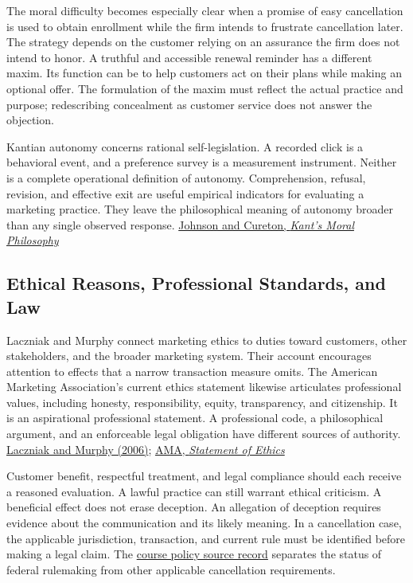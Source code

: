 The moral difficulty becomes especially clear when a promise of easy
cancellation is used to obtain enrollment while the firm intends to
frustrate cancellation later. The strategy depends on the customer
relying on an assurance the firm does not intend to honor. A truthful
and accessible renewal reminder has a different maxim. Its function can
be to help customers act on their plans while making an optional offer.
The formulation of the maxim must reflect the actual practice and
purpose; redescribing concealment as customer service does not answer
the objection.

Kantian autonomy concerns rational self-legislation. A recorded click is
a behavioral event, and a preference survey is a measurement instrument.
Neither is a complete operational definition of autonomy. Comprehension,
refusal, revision, and effective exit are useful empirical indicators
for evaluating a marketing practice. They leave the philosophical
meaning of autonomy broader than any single observed response.
\href{https://plato.stanford.edu/entries/kant-moral/}{Johnson and
Cureton, \emph{Kant's Moral Philosophy}}

\hypertarget{M09-ethical-reasons-professional-standards-and-law}{%
\subsection{Ethical Reasons, Professional Standards, and
Law}\label{M09-ethical-reasons-professional-standards-and-law}}

\noindent \noindent Laczniak and Murphy connect marketing ethics to duties toward
customers, other stakeholders, and the broader marketing system. Their
account encourages attention to effects that a narrow transaction
measure omits. The American Marketing Association's current ethics
statement likewise articulates professional values, including honesty,
responsibility, equity, transparency, and citizenship. It is an
aspirational professional statement. A professional code, a
philosophical argument, and an enforceable legal obligation have
different sources of authority.
\href{https://epublications.marquette.edu/market_fac/45/}{Laczniak and
Murphy (2006)}; \href{https://www.ama.org/ama-statement-of-ethics/}{AMA,
\emph{Statement of Ethics}}

Customer benefit, respectful treatment, and legal compliance should each
receive a reasoned evaluation. A lawful practice can still warrant
ethical criticism. A beneficial effect does not erase deception. An
allegation of deception requires evidence about the communication and
its likely meaning. In a cancellation case, the applicable jurisdiction,
transaction, and current rule must be identified before making a legal
claim. The
\href{../01_Resources/13_Consumer_Agency_and_Recent_Research/Policy/README.md}{course
policy source record} separates the status of federal rulemaking from
other applicable cancellation requirements.

